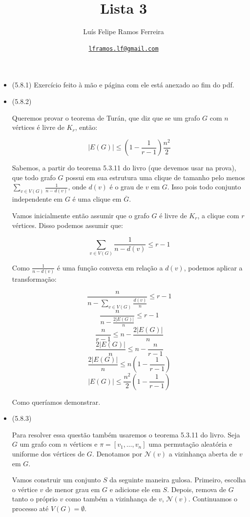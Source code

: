 \documentclass{article}
\title{Lista 3}
\author{Luís Felipe Ramos Ferreira}
\date{\href{mailto:lframos.lf@gmail.com}{\texttt{lframos.lf@gmail.com}}
}
\begin{document}
\maketitle

\begin{itemize}
	\item (5.8.1) Exercício feito à mão e página com ele está anexado ao fim do pdf.

	\item (5.8.2)

	      Queremos provar o teorema de Turán, que diz que se um grafo \(G\) com \(n\) vértices é livre de \(K_r\), então:

	      \[|E(G)| \leq (1 - \frac{1}{r-1})\frac{n^2}{2}\]

	      Sabemos, a partir do teorema 5.3.11 do livro (que devemos usar na prova), que todo grafo \(G\) possui em sua estrutura uma clique de tamanho pelo menos \(\sum_{v \in V(G)} \frac{1}{n - d(v)}\),
	      onde \(d(v)\) é o grau de \(v\) em \(G\). Isso pois todo conjunto independente em \(G\) é uma clique em \(\overline{G}\).

	      Vamos inicialmente então assumir que o grafo \(G\) é livre de \(K_r\), a clique com \(r\) vértices. Disso podemos assumir que:

	      \[\sum_{v \in V(G)} \frac{1}{n - d(v)} \leq r -1\]

	      Como \(\frac{1}{n - d(v)}\) é uma função convexa em relação a \(d(v)\), podemos aplicar a transformação:

	      \[\frac{n}{n - \sum_{v \in V(G)} \frac{d(v)}{n}} \leq r - 1\]
	      \[\frac{n}{n - \frac{2 |E(G)|}{n}} \leq r - 1\]
	      \[\frac{n}{r - 1} \leq n - \frac{2 |E(G)|}{n}\]
	      \[\frac{2 |E(G)|}{n} \leq n - \frac{n}{r - 1}\]
	      \[\frac{2 |E(G)|}{n} \leq n (1 - \frac{1}{r - 1})\]
	      \[|E(G)| \leq \frac{n^2}{2} (1 - \frac{1}{r - 1})\]

	      Como queríamos demonstrar.


	\item (5.8.3)

	      Para resolver essa questão também usaremos o teorema 5.3.11 do livro. Seja \(G\) um grafo com \(n\) vértices e \(\pi = [v_1, \dots, v_{n}]\) uma permutação
	      aleatória e uniforme dos vértices de \(G\). Denotamos por \(\mathcal{N}(v)\) a vizinhança aberta de \(v\) em \(G\).

	      Vamos construir um conjunto \(S\) da seguinte maneira gulosa. Primeiro, escolha o vértice \(v\) de menor grau em \(G\) e adicione ele em \(S\).
	      Depois, remova de \(G\) tanto o próprio \(v\) como também a vizinhança de \(v\), \(\mathcal{N}(v)\). Continuamos o processo até \(V(G) = \emptyset\).


\end{itemize}
\end{document}
